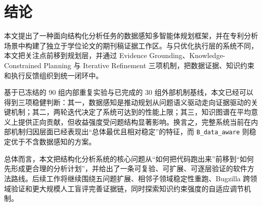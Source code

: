 \section{结论}

本文提出了一种面向结构化分析任务的数据感知多智能体规划框架，并在专利分析场景中构建了独立于学位论文的期刊稿证据工作区。与只优化执行层的系统不同，本文把关注点前移到规划层，并通过 Evidence Grounding、Knowledge-Constrained Planning 与 Iterative Refinement 三项机制，把数据证据、知识约束和执行反馈组织到统一闭环中。

基于已冻结的 90 组内部重复实验与已完成的 30 组外部机制基线，本文已经可以得到三项稳健判断：其一，数据感知是推动规划从问题语义驱动走向证据驱动的关键机制；其二，两轮迭代决定了系统可达到的性能上限；其三，知识图谱在平均意义上提供正向贡献，但收益强度受问题结构显著影响。换言之，完整系统当前在内部机制归因层面已经表现出“总体最优且相对稳定”的特征，而 \texttt{B\_data\_aware} 则稳定优于不含数据感知的方案。


总体而言，本文把结构化分析系统的核心问题从“如何把代码跑出来”前移到“如何先形成更合理的分析计划”，并给出了一条可复验、可扩展、可逐层验证的软件方法路线。后续工作将继续围绕五问题扩展、相邻子领域稳定性重跑、Bugzilla 跨领域验证和更大规模人工盲评完善证据链，同时探索知识约束强度的自适应调节机制。
